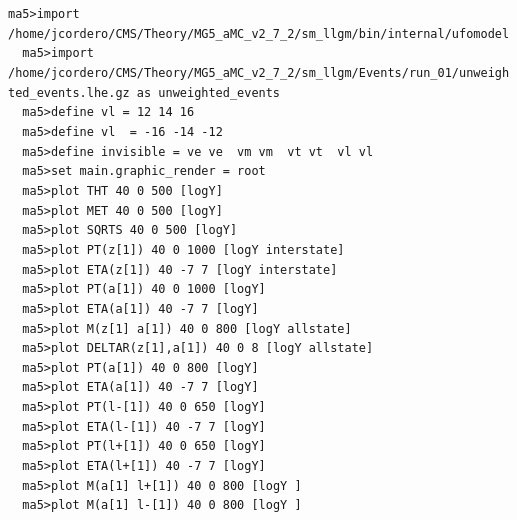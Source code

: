 \documentclass[a4paper, 10pt]{article}
\begin{document}
\texttt{ma5>import /\-home/\-jcordero/\-CMS/\-Theory/\-MG5\_aMC\_v2\_7\_2/\-sm\_llgm/\-bin/\-internal/\-ufomodel\\
}
\texttt{ }\texttt{ }\texttt{ma5>import /\-home/\-jcordero/\-CMS/\-Theory/\-MG5\_aMC\_v2\_7\_2/\-sm\_llgm/\-Events/\-run\_01/\-unweighted\_events.lhe.gz as unweighted\_events\\
}
\texttt{ }\texttt{ }\texttt{ma5>define vl = 12 14 16\\
}
\texttt{ }\texttt{ }\texttt{ma5>define vl~ = -16 -14 -12\\
}
\texttt{ }\texttt{ }\texttt{ma5>define invisible = ve ve~ vm vm~ vt vt~ vl vl~\\
}
\texttt{ }\texttt{ }\texttt{ma5>set main.graphic\_render = root\\
}
\texttt{ }\texttt{ }\texttt{ma5>plot THT   40 0 500 [logY]\\
}
\texttt{ }\texttt{ }\texttt{ma5>plot MET   40 0 500 [logY]\\
}
\texttt{ }\texttt{ }\texttt{ma5>plot SQRTS 40 0 500 [logY]\\
}
\texttt{ }\texttt{ }\texttt{ma5>plot PT(z[1]) 40 0 1000 [logY interstate]\\
}
\texttt{ }\texttt{ }\texttt{ma5>plot ETA(z[1]) 40 -7 7 [logY interstate]\\
}
\texttt{ }\texttt{ }\texttt{ma5>plot PT(a[1]) 40 0 1000 [logY]\\
}
\texttt{ }\texttt{ }\texttt{ma5>plot ETA(a[1]) 40 -7 7 [logY]\\
}
\texttt{ }\texttt{ }\texttt{ma5>plot M(z[1] a[1]) 40 0 800 [logY allstate]\\
}
\texttt{ }\texttt{ }\texttt{ma5>plot DELTAR(z[1],a[1]) 40 0 8 [logY allstate]\\
}
\texttt{ }\texttt{ }\texttt{ma5>plot PT(a[1]) 40 0 800 [logY]\\
}
\texttt{ }\texttt{ }\texttt{ma5>plot ETA(a[1]) 40 -7 7 [logY]\\
}
\texttt{ }\texttt{ }\texttt{ma5>plot PT(l-[1]) 40 0 650 [logY]\\
}
\texttt{ }\texttt{ }\texttt{ma5>plot ETA(l-[1]) 40 -7 7 [logY]\\
}
\texttt{ }\texttt{ }\texttt{ma5>plot PT(l+[1]) 40 0 650 [logY]\\
}
\texttt{ }\texttt{ }\texttt{ma5>plot ETA(l+[1]) 40 -7 7 [logY]\\
}
\texttt{ }\texttt{ }\texttt{ma5>plot M(a[1] l+[1]) 40 0 800 [logY ]\\
}
\texttt{ }\texttt{ }\texttt{ma5>plot M(a[1] l-[1]) 40 0 800 [logY ]\\
}
\end{document}
